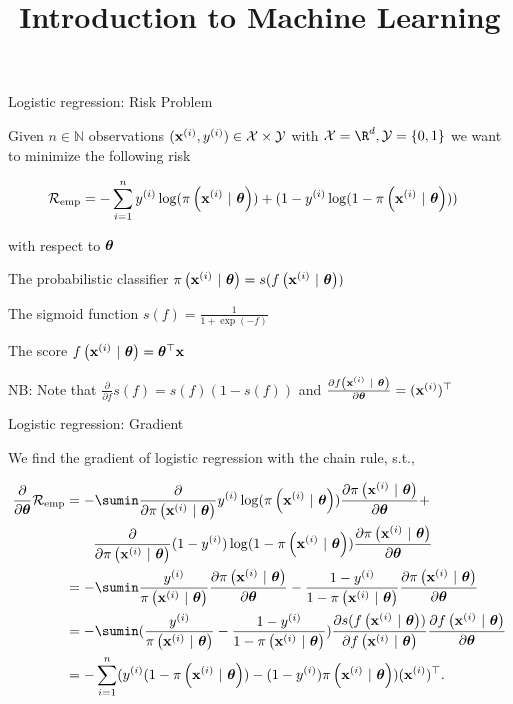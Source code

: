 \documentclass[11pt,compress,t,notes=noshow, xcolor=table]{beamer}
\title{Introduction to Machine Learning}
\begin{document}
    

\begin{framei}{Logistic regression: Risk Problem}

\item Given $n \in \mathbb{N}$ observations $(\mathbf{x}^{(i)}, y^{(i)}) \in \mathcal{X} \times \mathcal{Y}$ with  $\Xspace = \R^d, \Yspace = \{0, 1\}$ we want to minimize the following risk 

\begin{align*}
  \mathcal{R}_{\text{emp}} & = 
  -\sum^n_{i=1} y^{(i)}\log(\pi\left(\mathbf{x}^{(i)} ~|~ \bm{\theta}\right)) + (1-y^{(i)}\log(1-\pi\left(\mathbf{x}^{(i)} ~|~ \bm{\theta}\right)))
\end{align*}

with respect to $\bm{\theta}$

\item The probabilistic classifier $\pi\left(\mathbf{x}^{(i)} ~|~ \bm{\theta}\right) = s(f\left(\mathbf{x}^{(i)} ~|~ \bm{\theta}\right))$

\item The sigmoid function $s(f) = \frac{1}{1 + \exp(-f)}$

\item The score $f\left(\mathbf{x}^{(i)} ~|~ \bm{\theta}\right) = \bm{\theta}^\top \mathbf{x}$

\item NB: Note that $\frac{\partial}{\partial f} s(f) = s(f)(1-s(f))$ and $\frac{\partial f\left(\mathbf{x}^{(i)} ~|~ \bm{\theta}\right)}{\partial \bm{\theta}} = (\mathbf{x}^{(i)})^\top$

\end{framei}

\begin{frame2}[small]{Logistic regression: Gradient}

We find the gradient of logistic regression with the chain rule, s.t., 

\vfill

\begin{align*}
  \frac{\partial}{\partial\thetav}\riske  & =  
 -\sumin \frac{\partial}{\partial\pixit }\yi\log(\pixit)\frac{\partial\pixit}{\partial \thetav} +  \\
 & \qquad \frac{\partial}{\partial\pixit} (1-\yi)\log(1-\pixit)\frac{\partial\pixit}{\partial \thetav}\\
 & =  
 -\sumin \frac{\yi}{\pixit}\frac{\partial\pixit}{\partial \thetav} -  \frac{1-\yi}{1-\pixit}\frac{\partial\pixit}{\partial \thetav}\\
 &=  
  -\sumin (\frac{\yi}{\pixit} -  \frac{1-\yi}{1-\pixit})\frac{\partial s(\fxit)}{\partial  \fxit}\frac{\partial  \fxit}{\partial\thetav}\\
  &=  
  -\sum^n_{i=1} (\yi(1-\pixit)  -  (1-\yi)\pixit )(\xi)^\top.\\
\end{align*}

\end{frame2}
\end{document}
